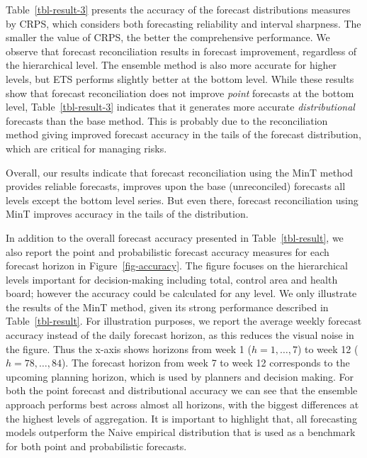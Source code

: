 \documentclass[
  authoryear,
  preprint,
  3p]{elsarticle}
\begin{document}
\begin{table}
\begin{minipage}[t]{\linewidth}
{}

\end{minipage}%

\end{table}

Table~\ref{tbl-result-3} presents the accuracy of the forecast
distributions measures by CRPS, which considers both forecasting
reliability and interval sharpness. The smaller the value of CRPS, the
better the comprehensive performance. We observe that forecast
reconciliation results in forecast improvement, regardless of the
hierarchical level. The ensemble method is also more accurate for higher
levels, but ETS performs slightly better at the bottom level. While
these results show that forecast reconciliation does not improve
\emph{point} forecasts at the bottom level, Table~\ref{tbl-result-3}
indicates that it generates more accurate \emph{distributional}
forecasts than the base method. This is probably due to the
reconciliation method giving improved forecast accuracy in the tails of
the forecast distribution, which are critical for managing risks.

Overall, our results indicate that forecast reconciliation using the
MinT method provides reliable forecasts, improves upon the base
(unreconciled) forecasts all levels except the bottom level series. But
even there, forecast reconciliation using MinT improves accuracy in the
tails of the distribution.

In addition to the overall forecast accuracy presented in
Table~\ref{tbl-result}, we also report the point and probabilistic
forecast accuracy measures for each forecast horizon in
Figure~\ref{fig-accuracy}. The figure focuses on the hierarchical levels
important for decision-making including total, control area and health
board; however the accuracy could be calculated for any level. We only
illustrate the results of the MinT method, given its strong performance
described in Table~\ref{tbl-result}. For illustration purposes, we
report the average weekly forecast accuracy instead of the daily
forecast horizon, as this reduces the visual noise in the figure. Thus
the x-axis shows horizons from week 1 (\(h= 1,\dots,7\)) to week 12
(\(h= 78,\dots,84\)). The forecast horizon from week 7 to week 12
corresponds to the upcoming planning horizon, which is used by planners
and decision making. For both the point forecast and distributional
accuracy we can see that the ensemble approach performs best across
almost all horizons, with the biggest differences at the highest levels
of aggregation. It is important to highlight that, all forecasting
models outperform the Naive empirical distribution that is used as a
benchmark for both point and probabilistic forecasts.
\end{document}
